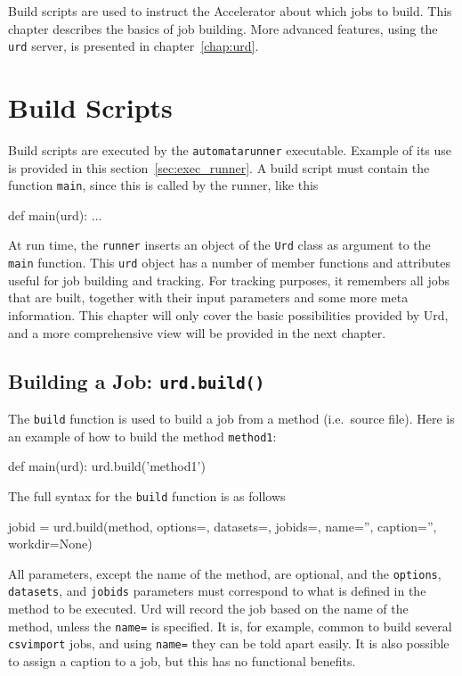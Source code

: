 \label{chap:urd_basic}

Build scripts are used to instruct the Accelerator about which jobs to
build.  This chapter describes the basics of job building.  More
advanced features, using the \texttt{urd} server, is presented in
chapter~\ref{chap:urd}.



\section{Build Scripts}
Build scripts are executed by the \texttt{automatarunner} executable.
Example of its use is provided in this section~\ref{sec:exec_runner}.
A build script must contain the function \texttt{main}, since this is
called by the runner, like this
\begin{python}
def main(urd):
    ...
\end{python}
At run time, the \texttt{runner} inserts an object of the \texttt{Urd}
class as argument to the \texttt{main} function.  This \texttt{urd}
object has a number of member functions and attributes useful for job
building and tracking.  For tracking purposes, it remembers all jobs
that are built, together with their input parameters and some more
meta information.  This chapter will only cover the basic
possibilities provided by Urd, and a more comprehensive view will be
provided in the next chapter.



\subsection{Building a Job: \texttt{urd.build()}}
The \texttt{build} function is used to build a job from a method
(i.e.\ source file).  Here is an example of how to build the method
\texttt{method1}:
\begin{python}
def main(urd):
    urd.build('method1')
\end{python}
The full syntax for the \texttt{build} function is as follows
\begin{python}
jobid = urd.build(method,
                  options={}, datasets={}, jobids={},
                  name='', caption='', workdir=None)
\end{python}
All parameters, except the name of the method, are optional, and
the \texttt{options}, \texttt{datasets}, and \texttt{jobids}
parameters must correspond to what is defined in the method to be
executed.  Urd will record the job based on the name of the method,
unless the \texttt{name=} is specified.  It is, for example, common to
build several \texttt{csvimport} jobs, and using \texttt{name=} they
can be told apart easily.  It is also possible to assign a caption to
a job, but this has no functional benefits.

